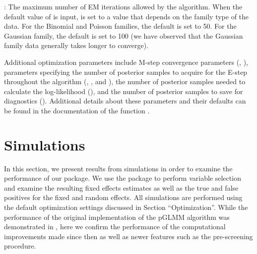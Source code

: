 : The maximum number of EM iterations allowed by the
algorithm. When the default value of  is input,
 is set to a value that depends on the family type of
the data. For the Binomial and Poisson families, the default is set to
50. For the Gaussian family, the default is set to 100 (we have observed
that the Gaussian family data generally takes longer to converge).




Additional optimization parameters include M-step convergence parameters (, ), parameters specifying the number of posterior samples to acquire for the E-step throughout the algorithm (, , and ), the number of posterior samples needed to calculate the log-likelihood (), and the number of posterior samples to save for diagnostics (). Additional details about these parameters and their defaults can be found in the  documentation of the function .

\section{Simulations}
\label{sec:simulations}

In this section, we present results from simulations in order to
examine the performance of our package.  We use the  package to perform variable selection and examine the resulting fixed effects estimates as well as
the true and false positives for the fixed and random effects. All
simulations are performed using the default optimization settings
discussed in Section ``Optimization''.  While the performance of the original implementation of the pGLMM algorithm was demonstrated in \cite{rashid2020}, here we confirm the performance of the computational improvements made since then as well as newer features such as the pre-screening procedure. 


